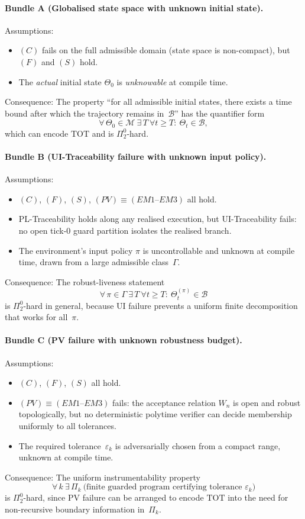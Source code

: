 \documentclass[12pt]{article}
\theoremstyle{definition}
\theoremstyle{plain}
\begin{document}
\paragraph{Bundle A (Globalised state space with unknown initial state).}
Assumptions:
\begin{itemize}[leftmargin=1.5em]
\item \((C)\) fails on the full admissible domain 
  (state space is non-compact), but \((F)\) and \((S)\) hold.
\item The \emph{actual} initial state \(\Theta_0\) is \emph{unknowable} 
  at compile time.
\end{itemize}
Consequence:
The property ``for all admissible initial states, 
there exists a time bound after which the trajectory remains in~\(\mathcal{B}\)'' 
has the quantifier form
\[
\forall\, \Theta_0 \in \mathcal{M}\ \exists\, T\ \forall t\ge T:\ \Theta_t \in \mathcal{B},
\]
which can encode \(\mathrm{TOT}\) and is \(\Pi^0_2\)-hard.

\paragraph{Bundle B (UI-Traceability failure with unknown input policy).}
Assumptions:
\begin{itemize}[leftmargin=1.5em]
\item \((C)\), \((F)\), \((S)\), \((PV) \equiv (EM1–EM3)\) all hold.
\item PL-Traceability holds along any realised execution, 
  but UI-Traceability fails: no open tick-0 guard partition 
  isolates the realised branch.
\item The environment’s input policy \(\pi\) is uncontrollable and unknown 
  at compile time, drawn from a large admissible class~\(\Gamma\).
\end{itemize}
Consequence:
The robust-liveness statement
\[
\forall\, \pi\in\Gamma\ \exists\, T\ \forall t\ge T:\ 
\Theta_t^{(\pi)} \in \mathcal{B}
\]
is \(\Pi^0_2\)-hard in general, because UI failure prevents 
a uniform finite decomposition that works for all~\(\pi\).

\paragraph{Bundle C (PV failure with unknown robustness budget).}
Assumptions:
\begin{itemize}[leftmargin=1.5em]
\item \((C)\), \((F)\), \((S)\) all hold.
\item  \((PV) \equiv (EM1–EM3)\) fails: the acceptance relation \(W_n\) 
  is open and robust topologically, but no deterministic polytime verifier 
  can decide membership uniformly to all tolerances.
\item The required tolerance~\(\varepsilon_k\) is adversarially chosen 
  from a compact range, unknown at compile time.
\end{itemize}
Consequence:
The uniform instrumentability property
\[
\forall\, k\ \exists\, \Pi_k\ \text{(finite guarded program certifying tolerance $\varepsilon_k$)}
\]
is \(\Pi^0_2\)-hard, since PV failure can be arranged 
to encode \(\mathrm{TOT}\) into the need for 
non-recursive boundary information in~\(\Pi_k\).
\end{document}
